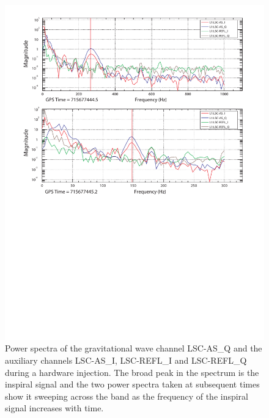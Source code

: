 \begin{figure}[p]
  \vspace{5pt}
  \begin{flushright}
    \includegraphics[width=\textwidth]{figures/hardware/veto_safe}    
  \end{flushright}
  \caption[Study of Veto Safety Using Hardware Injections]{%
\label{f:veto_safe}
  Power spectra of the gravitational wave channel LSC-AS\_Q and the auxiliary
  channels LSC-AS\_I, LSC-REFL\_I and LSC-REFL\_Q during a 
  hardware injection. The broad peak in the spectrum is the inspiral signal
  and the two power spectra taken at subsequent times show it sweeping across
  the band as the frequency of the inspiral signal increases with time.
  }
\end{figure}




